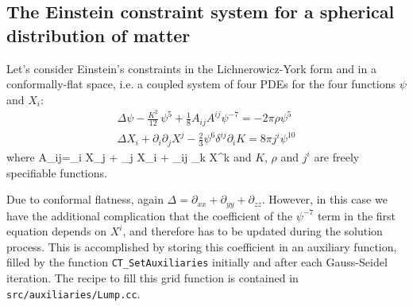 \subsection{The Einstein constraint system for a spherical distribution of matter}
Let's consider Einstein's constraints in the Lichnerowicz-York form
and in a conformally-flat space, 
i.e. a coupled system of four PDEs for the four functions $\psi$ and 
$X_i$:
\begin{eqnarray}
\label{eq:CTT}
 \Delta \psi - \frac{K^2}{12}\,\psi^5 + \frac{1}{8} {A}_{ij} {A}^{ij} \psi^{-7} = - 2 \pi \rho \psi^5 \\
 \Delta X_i + \partial_i \partial_j X^j - \frac{2}{3} \psi^6 \delta^{ij} \partial_i K = 8 \pi j^i \psi^{10}
\end{eqnarray} 
where
\beq
A_{ij}=\partial_i X_j + \partial_j X_i +  \; \delta_{ij} \partial_k X^k
\eeq
and $K$, $\rho$ and $j^i$ are freely specifiable functions.

Due to conformal flatness, again $\Delta = \partial_{xx} + \partial_{yy} 
+ \partial_{zz}$. However, in this case we have the additional
complication that the coefficient of the $\psi^{-7}$ term in the
first equation depends on $X^i$, and therefore has to be updated
during the solution process. This is accomplished by storing this 
coefficient in an auxiliary function, filled by the function
\texttt{CT\_SetAuxiliaries} initially and after each Gauss-Seidel 
iteration. The recipe to fill this grid function is contained in
\texttt{src/auxiliaries/Lump.cc}.

